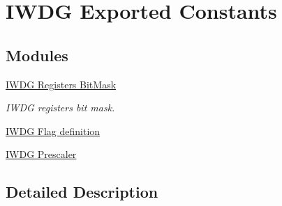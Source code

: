 \hypertarget{group___i_w_d_g___exported___constants}{}\section{I\+W\+DG Exported Constants}
\label{group___i_w_d_g___exported___constants}
\subsection*{Modules}
\begin{DoxyCompactItemize}
\item 
\hyperlink{group___i_w_d_g___registers___bit_mask}{I\+W\+D\+G Registers Bit\+Mask}
\begin{DoxyCompactList}\small\item\em I\+W\+DG registers bit mask. \end{DoxyCompactList}\item 
\hyperlink{group___i_w_d_g___flag__definition}{I\+W\+D\+G Flag definition}
\item 
\hyperlink{group___i_w_d_g___prescaler}{I\+W\+D\+G Prescaler}
\end{DoxyCompactItemize}


\subsection{Detailed Description}
